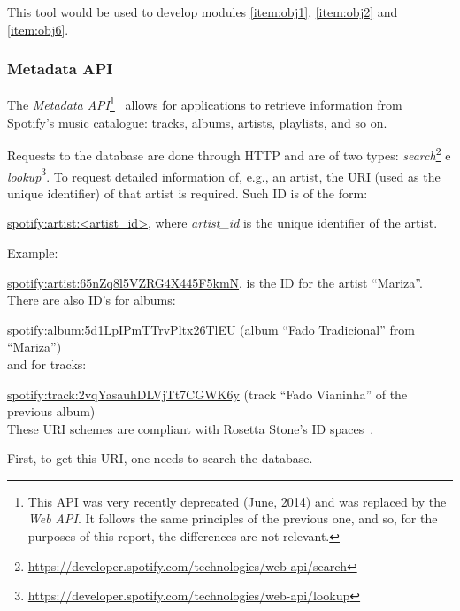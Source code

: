         This tool would be used to develop modules \ref{item:obj1}, \ref{item:obj2} and \ref{item:obj6}.
        



      \subsubsection{Metadata API} %
      \label{sub:metadata_api}

        The \emph{Metadata API}\footnote{This API was very recently deprecated (June, 2014) and was replaced by the \emph{Web API}. It follows the same principles of the previous one, and so, for the purposes of this report, the differences are not relevant.}~\cite{spmetadata} allows for applications to retrieve information from Spotify's music catalogue: tracks, albums, artists, playlists, and so on.

        Requests to the database are done through HTTP and are of two types: \emph{search}\footnote{\url{https://developer.spotify.com/technologies/web-api/search}} e \emph{lookup}\footnote{\url{https://developer.spotify.com/technologies/web-api/lookup}}.
        To request detailed information of, e.g., an artist, the URI (used as the unique identifier) of that artist is required. Such ID is of the form:

        \url{spotify:artist:<artist_id>}, where \emph{artist\_id} is the unique identifier of the artist.

        Example:

        \url{spotify:artist:65nZq8l5VZRG4X445F5kmN}, is the ID for the artist ``Mariza''. \\

        There are also ID's for albums:

        \url{spotify:album:5d1LpIPmTTrvPltx26TlEU} (album ``Fado Tradicional'' from ``Mariza'') \\

         and for tracks:

         \url{spotify:track:2vqYasauhDLVjTt7CGWK6y} (track ``Fado Vianinha'' of the previous album) \\

        These URI schemes are compliant with Rosetta Stone's ID spaces~\cite{rosettastone}.

        First, to get this URI, one needs to search the database.

